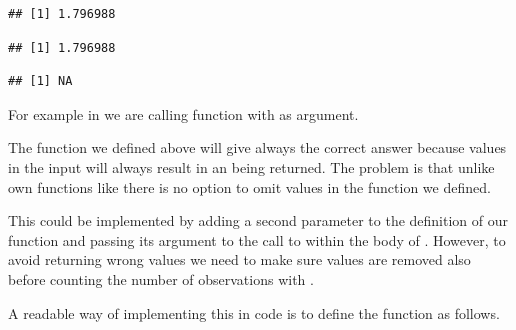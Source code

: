 \documentclass[krantz2]{krantz}\usepackage{knitr}%
\begin{document}
\begin{knitrout}\footnotesize
{}\color{fgcolor}\begin{kframe}
\begin{alltt}
 \hlkwb{<-} \hlstd{(}\hlstd{,} \hlstd{,} \hlstd{,} \hlopt{-}\hlstd{)}
 \hlkwb{<-}  \hlstd{)}
\hlstd{(} 
\end{alltt}
\begin{verbatim}
## [1] 1.796988
\end{verbatim}
\begin{alltt}
\end{alltt}
\begin{verbatim}
## [1] 1.796988
\end{verbatim}
\begin{alltt}
\end{alltt}
\begin{verbatim}
## [1] NA
\end{verbatim}
\end{kframe}
\end{knitrout}

For example in  we are calling function  with  as argument.

The function we defined above will give always the correct answer because  values in the input will always result in an  being returned. The problem is that unlike \Rlang own functions like  there is no option to omit  values in the function we defined.

This could be implemented by adding a second parameter  to the definition of our function and passing its argument to the call to  within the body of . However, to avoid returning wrong values we need to make sure  values are removed also before counting the number of observations with .

A readable way of implementing this in code is to define the function as follows.

\begin{knitrout}\footnotesize
{}\color{fgcolor}\begin{kframe}
\begin{alltt}
 \hlkwb{<-} \hlstd{(}\hlstd{,}  \hlstd{=} \hlstd{) \{}
  
    \hlkwb{<-} 
 \hlstd{\}}
 \hlstd{(}\hlopt{/}
\hlstd{\}}
\end{alltt}
\end{kframe}
\end{knitrout}
\end{document}
